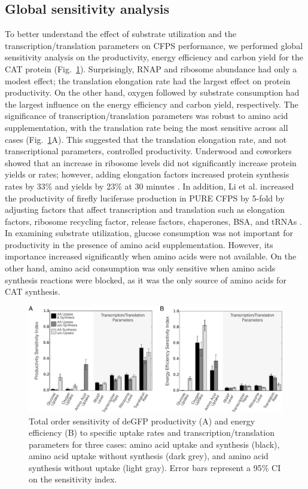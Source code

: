\documentclass[journal=asbcd6,manuscript=article]{achemso}
\begin{document}
\subsection{Global sensitivity analysis}
To better understand the effect of substrate utilization and the transcription/translation parameters on CFPS performance, we performed global sensitivity analysis on the productivity, energy efficiency and carbon yield for the CAT protein (Fig.~\ref{fig:SI}).
Surprisingly, RNAP and ribosome abundance had only a modest effect;
the translation elongation rate had the largest effect on protein productivity.
On the other hand, oxygen followed by substrate consumption had the largest influence on the energy efficiency and carbon yield, respectively.
The significance of transcription/translation parameters was robust to amino acid supplementation, with the translation rate being the most sensitive across all cases (Fig.~\ref{fig:SI}A).
This suggested that the translation elongation rate, and not transcriptional parameters, controlled productivity.
Underwood and coworkers showed that an increase in ribosome levels did not significantly increase protein yields or rates; however, adding elongation factors increased protein synthesis rates by 33\% and yields by 23\% at 30 minutes \cite{2005_underwood_biotech}.
In addition, Li et al. increased the productivity of firefly luciferase production in PURE CFPS by 5-fold by adjusting factors that affect transcription and translation such as elongation factors, ribosome recycling factor, release factors, chaperones, BSA, and tRNAs \cite{2014_li_PlosOne}.
In examining substrate utilization, glucose consumption was not important for productivity in the presence of amino acid supplementation.
However, its importance increased significantly when amino acids were not available.
On the other hand, amino acid consumption was only sensitive when amino acids synthesis reactions were blocked, as it was the only source of amino acids for CAT synthesis.
\begin{figure}[t!]
\includegraphics[width=1.00\textwidth]{./figs/Fig-3-Sensitivity-Analysis.pdf}
\caption{Total order sensitivity of deGFP productivity (A) and energy efficiency (B) to specific uptake rates and transcription/translation parameters for three cases: amino acid uptake and synthesis (black), amino acid uptake without synthesis (dark grey), and amino acid synthesis without uptake (light gray). Error bars represent a 95\% CI on the sensitivity index.}
\label{fig:SI}
\end{figure}
\end{document}
